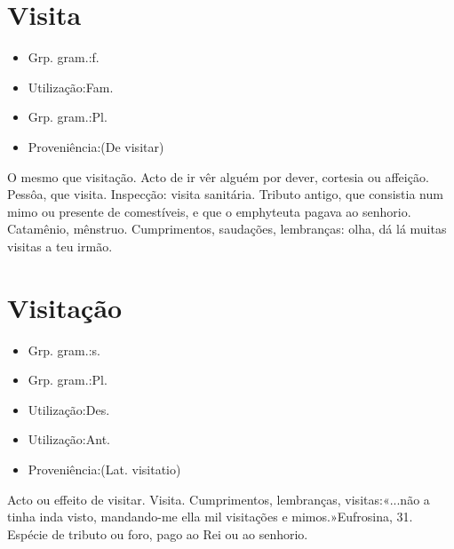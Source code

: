 \documentclass{article}
\begin{document}
\section{Visita}
\begin{itemize}
\item {Grp. gram.:f.}
\end{itemize}
\begin{itemize}
\item {Utilização:Fam.}
\end{itemize}
\begin{itemize}
\item {Grp. gram.:Pl.}
\end{itemize}
\begin{itemize}
\item {Proveniência:(De \textunderscore visitar\textunderscore )}
\end{itemize}
O mesmo que \textunderscore visitação\textunderscore .
Acto de ir vêr alguém por dever, cortesia ou affeição.
Pessôa, que visita.
Inspecção: \textunderscore visita sanitária\textunderscore .
Tributo antigo, que consistia num mimo ou presente de comestíveis, e que o emphyteuta pagava ao senhorio.
Catamênio, mênstruo.
Cumprimentos, saudações, lembranças: \textunderscore olha, dá lá muitas visitas a teu irmão\textunderscore .
\section{Visitação}
\begin{itemize}
\item {Grp. gram.:s.}
\end{itemize}
\begin{itemize}
\item {Grp. gram.:Pl.}
\end{itemize}
\begin{itemize}
\item {Utilização:Des.}
\end{itemize}
\begin{itemize}
\item {Utilização:Ant.}
\end{itemize}
\begin{itemize}
\item {Proveniência:(Lat. \textunderscore visitatio\textunderscore )}
\end{itemize}
Acto ou effeito de visitar.
Visita.
Cumprimentos, lembranças, visitas:«\textunderscore ...não a tinha inda visto, mandando-me ella mil visitações e mimos.\textunderscore »\textunderscore Eufrosina\textunderscore , 31.
Espécie de tributo ou foro, pago ao Rei ou ao senhorio.
\end{document}
